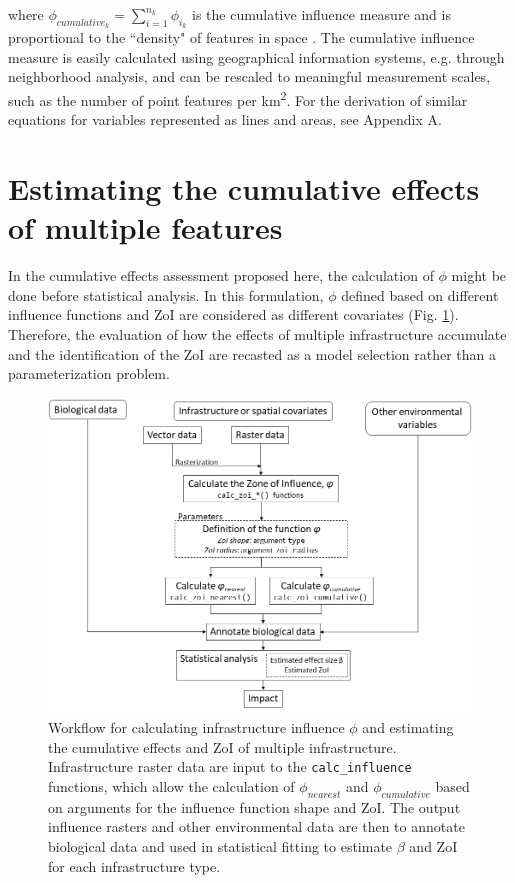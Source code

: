 \documentclass[titlepage]{article}
\begin{document}
{where $\phi_{cumulative_k} = \sum_{i=1}^{n_k} \phi_{i_k}$ is the cumulative influence measure and is proportional to 
the ``density" of features in space \citep[e.g.][]{panzacchi_searching_2015}. The cumulative influence measure is easily calculated using geographical information systems, e.g. through neighborhood analysis, and can be rescaled to meaningful measurement scales, such as the number of point features per km\textsuperscript{2}. For the derivation of similar equations for variables represented as lines and areas, see Appendix A.

\section{Estimating the cumulative effects of multiple features}

In the cumulative effects assessment proposed here, the calculation of $\phi$ might be done before statistical analysis. In this formulation, $\phi$ defined based on different influence functions and ZoI are considered as different covariates (Fig. \ref{fig:workflow}). Therefore, the evaluation of how the effects of multiple infrastructure accumulate and the identification of the ZoI are recasted as a model selection rather than a parameterization problem.

\begin{figure}[h]
\centering
\includegraphics[width=1.3\textwidth,center]{figures/figure_workflow.png}
\caption{\label{fig:workflow} Workflow for calculating infrastructure influence $\phi$ and estimating the cumulative effects and ZoI of multiple infrastructure. Infrastructure raster data are input to the \texttt{calc\_influence} functions, which allow the calculation 
of $\phi_{nearest}$ and $\phi_{cumulative}$ based on arguments for the influence function shape and ZoI. The output influence rasters and other environmental data are then to annotate biological data and used in statistical fitting to estimate $\beta$ and ZoI for each infrastructure type.}
\end{figure}

}
\end{document}
